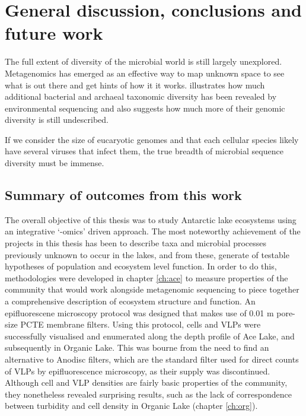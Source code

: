 \chapter{General discussion, conclusions and future work}
\label{ch:conc}
\acresetall

The full extent of diversity of the microbial world is still largely unexplored.
Metagenomics has emerged as an effective way to map unknown space to see what is out there and get hints of how it it works.
 illustrates how much additional bacterial and archaeal taxonomic diversity has been revealed by environmental sequencing and also suggests how much more of their genomic diversity is still undescribed. 

If we consider the size of eucaryotic genomes and that each cellular species likely have several viruses that infect them, the true breadth of microbial sequence diversity must be immense.


\section{Summary of outcomes from this work}
The overall objective of this thesis was to study Antarctic lake ecosystems using an integrative `-omics' driven approach.
The most noteworthy achievement of the projects in this thesis has been to describe taxa and microbial processes previously unknown to occur in the lakes, and from these,  generate of testable hypotheses of population and ecosystem level function.
In order to do this, methodologies were developed in chapter \ref{ch:ace} to measure properties of the community that would work alongside metagenomic sequencing to piece together a comprehensive description of ecosystem structure and function.
An epifluorescene microscopy protocol was designed that makes use of 0.01 \textmu{}m pore-size \ac{PCTE} membrane filters.
Using this protocol, cells and \acp{VLP} were successfully visualised and enumerated along the depth profile of Ace Lake, and subsequently in Organic Lake.
This was bourne from the need to find an alternative to Anodisc filters, which are the standard filter used for direct counts of \acp{VLP} by epifluorescence microscopy, as their supply was discontinued.
Although cell and \ac{VLP} densities are fairly basic properties of the community, they nonetheless revealed surprising results, such as the lack of correspondence between turbidity and cell density in Organic Lake (chapter \ref{ch:org}).


